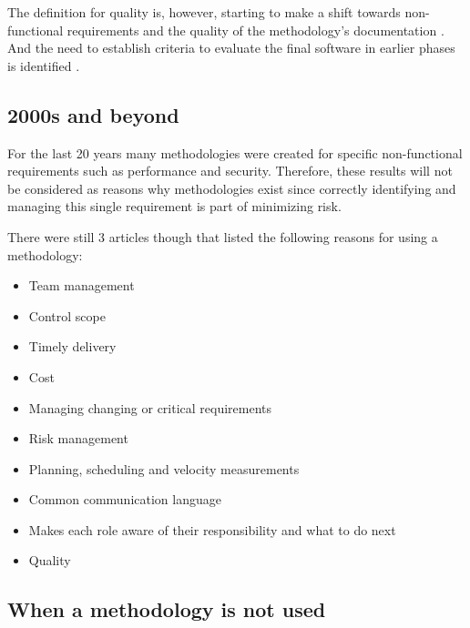 The definition for quality is, however, starting to make a shift towards non-functional requirements and the quality of the methodology's documentation \cite{scarre_1992}.
And the need to establish criteria to evaluate the final software in earlier phases is identified \cite{paul_1993, herald_1993, grossman_1997}.


\subsection{2000s and beyond}
For the last 20 years many methodologies were created for specific non-functional requirements such as performance and security.
Therefore, these results will not be considered as reasons why methodologies exist since correctly identifying and managing this single requirement is part of minimizing risk.

There were still 3 articles though that listed the following reasons for using a methodology:  
\begin{itemize}
    \item Team management \cite{lucena_2008}
    \item Control scope \cite{lucena_2008}
    \item Timely delivery \cite{lucena_2008, garg_2015}
    \item Cost \cite{lucena_2008, uzturk_2013, garg_2015}
    \item Managing changing or critical requirements \cite{lucena_2008, uzturk_2013}
    \item Risk management \cite{lucena_2008, uzturk_2013, garg_2015}
    \item Planning, scheduling and velocity measurements \cite{uzturk_2013}
    \item Common communication language \cite{uzturk_2013}
    \item Makes each role aware of their responsibility and what to do next \cite{uzturk_2013}
    \item Quality \cite{garg_2015}
\end{itemize}

\subsection{When a methodology is not used}
